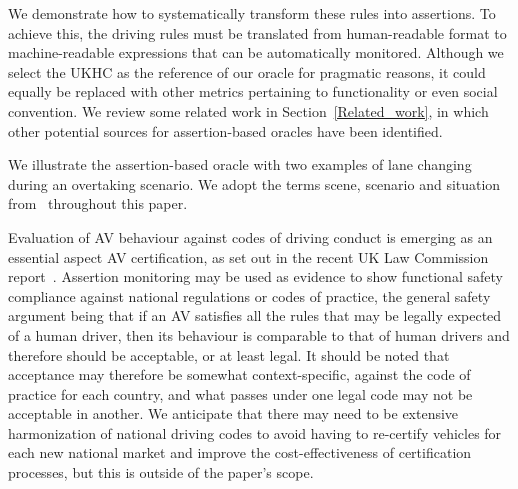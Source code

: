 %
We demonstrate how to systematically transform these rules into assertions. To achieve this, the driving rules must be translated from human-readable format to machine-readable expressions that can be automatically monitored. %
Although we select the UKHC as the reference of our oracle for pragmatic reasons, it could equally be replaced with other metrics pertaining to functionality or even social convention. We review some related work in Section~\ref{Related_work}, in which other potential sources for assertion-based oracles have been identified.
%
%

%
We illustrate the %
assertion-based oracle with two examples of %
lane changing during an overtaking scenario. We adopt the terms scene, scenario and situation from~\cite{Ulbrich2015} throughout this paper. 
%


Evaluation of AV behaviour against codes of driving conduct is emerging as an essential aspect AV %
certification, as set out in the recent UK Law Commission report~\cite{law_commission_UK}. 
%
Assertion monitoring may be used as evidence to show functional safety compliance against national regulations or codes of practice, the general safety argument being that if an AV satisfies all the rules that may be legally expected of a human driver, then its behaviour is comparable to that of human drivers and therefore should be acceptable, or at least legal. It should be noted that acceptance may therefore be somewhat context-specific, against the code of practice for each country, and what passes under one legal code may not be acceptable in another. 
% 
We anticipate that there may need to be extensive harmonization of national driving codes to avoid having to re-certify vehicles for each new national market and improve the cost-effectiveness of certification processes, but this is outside of the paper's scope.

